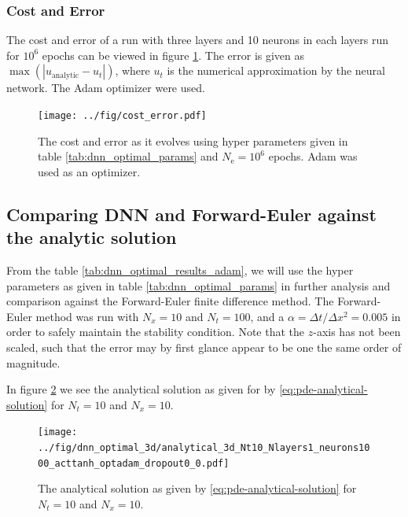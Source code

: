 \subsubsection{Cost and Error} 
The cost and error of a run with three layers and 10 neurons in each layers run for $10^6$ epochs can be viewed in figure \ref{fig:cost-error}. The error is given as $\max \left( | u_\mathrm{analytic} - u_t | \right)$, where $u_t$ is the numerical approximation by the neural network. The Adam optimizer were used.
\begin{figure}[h!tb]
    \centering
    \texttt{[image: ../fig/cost\_error.pdf]}
    \caption{The cost and error as it evolves using hyper parameters given in table \ref{tab:dnn_optimal_params} and $N_\mathrm{e}=10^6$ epochs. Adam was used as an optimizer.}
    \label{fig:cost-error}
\end{figure}



\subsection{Comparing DNN and Forward-Euler against the analytic solution}
From the table \ref{tab:dnn_optimal_results_adam}, we will use the hyper parameters as given in table \ref{tab:dnn_optimal_params} in further analysis and comparison against the Forward-Euler finite difference method. The Forward-Euler method was run with $N_x=10$ and $N_t=100$, and a $\alpha=\Delta t / \Delta x^2=0.005$ in order to safely maintain the stability condition. Note that the $z$-axis has not been scaled, such that the error may by first glance appear to be one the same order of magnitude.

In figure \ref{fig:analytical-solution} we see the analytical solution as given for by \eqref{eq:pde-analytical-solution} for $N_t=10$ and $N_x=10$.
\begin{figure}[h!tb]
    \centering
    \texttt{[image: ../fig/dnn\_optimal\_3d/analytical\_3d\_Nt10\_Nlayers1\_neurons1000\_acttanh\_optadam\_dropout0\_0.pdf]}
    \caption{The analytical solution as given by \eqref{eq:pde-analytical-solution} for $N_t=10$ and $N_x=10$.}
    \label{fig:analytical-solution}
\end{figure}

